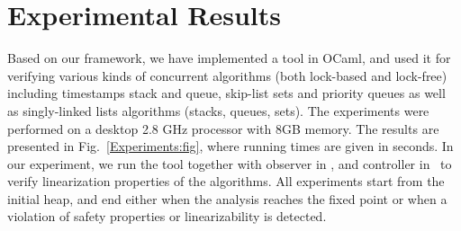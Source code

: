 \section{Experimental Results}
\label{section:experiments}
\newcommand{\emm}{(emm)}

 Based on our framework, we have implemented a tool in OCaml, and used
it for verifying various kinds of concurrent algorithms (both lock-based and lock-free)
including timestamps stack and queue, skip-list sets and priority queues as well as singly-linked lists algorithms (stacks, queues, sets). The experiments were performed on a desktop 2.8 GHz processor with 8GB memory. The results are presented in Fig.~\ref{Experiments:fig}, where running times are given in seconds. In our experiment, we run the tool together with observer in \cite{AHHR:integrated:rep}, \cite{BEEH:icalp15} and controller in~\cite{Quy:sas16} to verify linearization properties of the algorithms. All experiments start from the initial heap,  
and end either when the analysis reaches the fixed point or when a violation of safety properties or linearizability is detected. 

